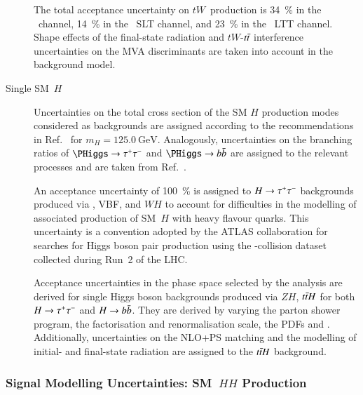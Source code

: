 \begin{description}
  The total acceptance uncertainty on $tW$~production is \SI{34}{\percent} in
  the \hadhad~channel, \SI{14}{\percent} in the \lephad~SLT channel, and
  \SI{23}{\percent} in the \lephad~LTT channel. Shape effects of the final-state
  radiation and $tW$-$t\bar{t}$ interference uncertainties on the MVA
  discriminants are taken into account in the background model.

\item[Single SM~$H$] Uncertainties on the total cross section of the SM $H$
  production modes considered as backgrounds are assigned according to the
  recommendations in Ref.~\cite{deFlorian:2016spz} for
  $m_{H} = \SI{125.0}{\GeV}$. Analogously, uncertainties on the branching ratios
  of $\PHiggs \to \tautau$ and $\PHiggs \to \bbbar$ are assigned to the relevant
  processes and are taken from Ref.~\cite{deFlorian:2016spz}.

  An acceptance uncertainty of \SI{100}{\percent} is assigned to $H \to \tau^{+} \tau^{-}$
  backgrounds produced via \ggF, VBF, and $WH$ to account for difficulties in
  the modelling of associated production of SM~$H$ with heavy flavour
  quarks. This uncertainty is a convention adopted by the ATLAS collaboration
  for searches for Higgs boson pair production using the \pp-collision dataset
  collected during Run~2 of the LHC.

  Acceptance uncertainties in the phase space selected by the analysis are
  derived for single Higgs boson backgrounds produced via $ZH$, $t\bar{t} H$ for
  both $H \to \tau^{+} \tau^{-}$ and $H \to b\bar{b}$. They are derived by varying the
  parton shower program, the factorisation and renormalisation scale, the PDFs
  and \alphas. Additionally, uncertainties on the NLO+PS matching and the
  modelling of initial- and final-state radiation are assigned to the $t\bar{t} H$
  background.
\end{description}





\subsubsection{Signal Modelling Uncertainties: SM~$HH$ Production}

